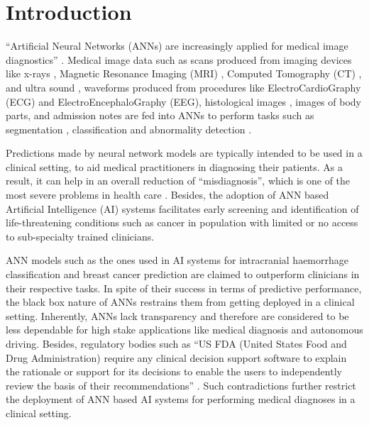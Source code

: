\documentclass[../report.tex]{subfiles}
\begin{document}
    \chapter{Introduction}
	 \enquote {Artificial Neural Networks (ANNs) are increasingly applied for medical image diagnostics} \cite{anwar2018medical}. Medical image data such as scans produced from imaging devices like x-rays \cite{ozturk2020automated}, Magnetic Resonance Imaging (MRI) \cite{xue2012window}, Computed Tomography (CT) \cite{lee2019explainable}, and ultra sound \cite{qian2021prospective}, waveforms produced from procedures like ElectroCardioGraphy (ECG) \cite{hicks2021explaining} and ElectroEncephaloGraphy (EEG), histological images \cite{binder2021morphological}, images of body parts, and admission notes \cite{li2017convolutional} are fed into ANNs to perform tasks such as segmentation \cite{Schwendicke2019}, classification \cite{Gurovich2019} and abnormality detection \cite{binder2021morphological}.
	
	Predictions made by neural network models are typically intended to be used in a clinical setting, to aid medical practitioners in diagnosing their patients. As a result, it can help in an overall reduction of \enquote{misdiagnosis}, which is one of the most severe problems in health care \cite{li2017convolutional}. Besides, the adoption of ANN based Artificial Intelligence (AI) systems facilitates early screening and identification of life-threatening conditions such as cancer in population with limited or no access to sub-specialty trained clinicians.
	
	ANN models such as the ones used in AI systems for intracranial haemorrhage classification \cite{lee2019explainable} and breast cancer prediction  \cite{mckinney2020international} are claimed to outperform clinicians in their respective tasks. In spite of their success in terms of predictive performance, the black box nature of ANNs restrains them from getting deployed in a clinical setting. Inherently, ANNs lack transparency and therefore are considered to be less dependable for high stake applications like medical diagnosis and autonomous driving. Besides, regulatory bodies such as \enquote{US FDA (United States Food and Drug Administration) require any clinical decision support software to explain the rationale or support for its decisions to enable the users to independently review the basis of their recommendations} \cite{lee2019explainable}. Such contradictions further restrict the deployment of ANN based AI systems for performing medical diagnoses in a clinical setting.
	
\end{document}
